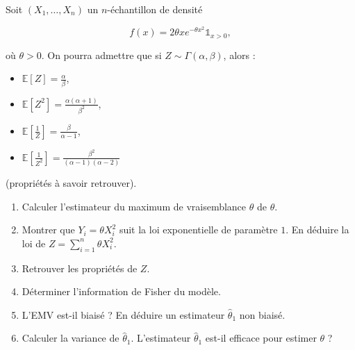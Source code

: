\begin{mdframed}
\begin{exercice}
Soit $(X_1, \dots, X_n)$ un $n$-échantillon de densité 

$$
f(x) = 2\theta x e^{-\theta x^2} \mathbb{1}_{x>0},
$$

où $\theta > 0$. On pourra admettre que si $Z \sim \Gamma(\alpha, \beta)$, alors :

\begin{itemize}
\item $\mathbb{E}[Z] = \frac{\alpha}{\beta}$, 
\item $\mathbb{E}[Z^2] = \frac{\alpha(\alpha+1)}{\beta^2}$, 
\item $\mathbb{E}\left[\frac{1}{Z}\right] = \frac{\beta}{\alpha-1}$, 
\item $\mathbb{E}\left[\frac{1}{Z^2}\right] = \frac{\beta^2}{(\alpha-1)(\alpha-2)}$
\end{itemize}

(propriétés à savoir retrouver).
\begin{enumerate}
    \item Calculer l'estimateur du maximum de vraisemblance $\hat{\theta}$ de $\theta$.
    \item Montrer que $Y_i = \theta X_i^2$ suit la loi exponentielle de paramètre $1$. En déduire la loi de $Z = \sum_{i=1}^n \theta X_i^2$.
\item Retrouver les propriétés de $Z$.
\item Déterminer l'information de Fisher du modèle.
    \item L'EMV est-il biaisé ? En déduire un estimateur $\hat{\theta}_1$ non biaisé.
    \item Calculer la variance de $\hat{\theta}_1$. L'estimateur $\hat{\theta}_1$ est-il efficace pour estimer $\theta$ ?
\end{enumerate}
\end{exercice}
\end{mdframed}

\medskip

